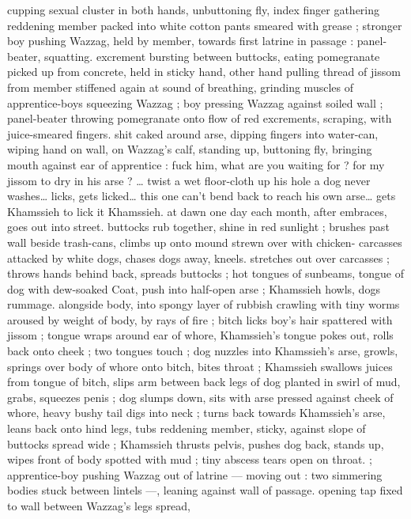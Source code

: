 cupping sexual cluster in both hands, unbuttoning fly, index finger 
gathering reddening member packed into white cotton pants 
smeared with grease ; stronger boy pushing Wazzag, held by 
member, towards first latrine in passage : panel-beater, squatting. 
excrement bursting between buttocks, eating pomegranate picked up 
from concrete, held in sticky hand, other hand pulling thread of 
jissom from member stiffened again at sound of breathing, grinding 
muscles of apprentice-boys squeezing Wazzag ; boy pressing 
Wazzag against soiled wall ; panel-beater throwing pomegranate 
onto flow of red excrements, scraping, with juice-smeared fingers. 
shit caked around arse, dipping fingers into water-can, wiping hand 
on wall, on Wazzag's calf, standing up, buttoning fly, bringing mouth 
against ear of apprentice : {\gl} fuck him, what are you waiting for ? {\td} 
for my jissom to dry in his arse ? {\ldots} twist a wet floor-cloth up his 
hole{\td} a dog never washes{\ldots} licks, gets licked{\ldots} this one can't bend 
back to reach his own arse{\ldots} gets Khamssieh to lick it{\td} Khamssieh. 
at dawn one day each month, after embraces, goes out into street. 
buttocks rub together, shine in red sunlight ; brushes past wall 
beside trash-cans, climbs up onto mound strewn over with chicken- 
carcasses attacked by white dogs, chases dogs away, kneels. 
stretches out over carcasses ; throws hands behind back, spreads 
buttocks ; hot tongues of sunbeams, tongue of dog with dew-soaked 
Coat, push into half-open arse ; Khamssieh howls, dogs rummage. 
alongside body, into spongy layer of rubbish crawling with tiny 
worms aroused by weight of body, by rays of fire ; bitch licks boy's 
hair spattered with jissom ; tongue wraps around ear of whore, 
Khamssieh's tongue pokes out, rolls back onto cheek ; two tongues 
touch ; dog nuzzles into Khamssieh's arse, growls, springs over body 
of whore onto bitch, bites throat ; Khamssieh swallows juices from 
tongue of bitch, slips arm between back legs of dog planted in swirl 
of mud, grabs, squeezes penis ; dog slumps down, sits with arse 
pressed against cheek of whore, heavy bushy tail digs into neck ; 
turns back towards Khamssieh's arse, leans back onto hind legs, 
tubs reddening member, sticky, against slope of buttocks spread 
wide ; Khamssieh thrusts pelvis, pushes dog back, stands up, wipes 
front of body spotted with mud ; tiny abscess tears open on throat.{\gr} 
; apprentice-boy pushing Wazzag out of latrine --- moving out : two 
simmering bodies stuck between lintels ---, leaning against wall of 
passage. opening tap fixed to wall between Wazzag's legs spread, 

